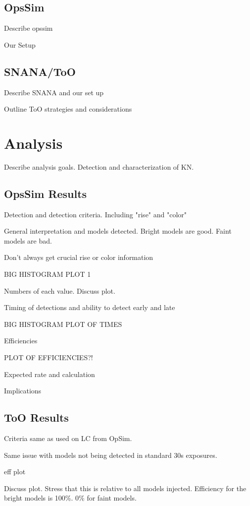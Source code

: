 \subsection{OpsSim}
\label{sec:ch6_opssim}
Describe opssim

Our Setup

\subsection{SNANA/ToO}
\label{sec:ch6_snana}
Describe SNANA and our set up

Outline ToO strategies and considerations

\section{Analysis}
\label{sec:ch6_analysis}
Describe analysis goals. Detection and characterization of KN. 

\subsection{OpsSim Results}
\label{sec:ch6_opssim_results}
Detection and detection criteria. Including "rise" and "color"

General interpretation and models detected. Bright models are good. Faint models are bad. 

Don't always get crucial rise or color information

BIG HISTOGRAM PLOT 1

Numbers of each value. Discuss plot.

Timing of detections and ability to detect early and late

BIG HISTOGRAM PLOT OF TIMES

Efficiencies

PLOT OF EFFICIENCIES?!

Expected rate and calculation

Implications

\subsection{ToO Results}
\label{sec:ch6_too_results}
Criteria same as used on LC from OpSim.

Same issue with models not being detected in standard 30s exposures. 

eff plot

Discuss plot. Stress that this is relative to all models injected. Efficiency for the bright models is 100\%. 0\% for faint models.

